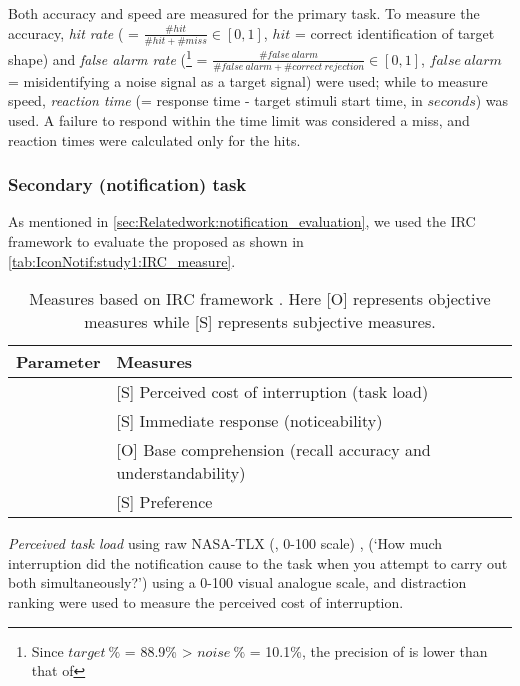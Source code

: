 Both accuracy and speed are measured for the primary task.
To measure the accuracy, \textit{hit rate} (\hitrate{} = $\frac{\#hit}{\#hit + \#miss} \in [0,1]$, $hit$ = correct identification of target shape) and \textit{false alarm rate} (\falsealarmrate{}\footnote{Since $target\:\%$ = 88.9\% > $noise\:\%$ = 10.1\%, the precision of \falsealarmrate{} is lower than that of  \hitrate{}} = $\frac{\#false\:alarm}{\#false\:alarm + \#correct\:rejection} \in [0,1]$, $false \: alarm$ = misidentifying a noise signal as a target signal) were used; while to measure speed, \textit{reaction time} (\reactionTime{}= response time - target stimuli start time, in $seconds$) was used. A failure to respond within the time limit was considered a miss, and reaction times were calculated only for the hits.

\subsubsection*{Secondary (notification) task}

As mentioned in \autoref{sec:Relatedwork:notification_evaluation}, we used the IRC framework to evaluate the proposed  as shown in \autoref{tab:IconNotif:study1:IRC_measure}.

\begin{table}[hptb]
\centering
\caption[Measures based on IRC framework]{Measures based on IRC framework \cite{chewar_unpacking_2004, mccrickard_model_2003, mccrickard_attuning_2003}. Here [O] represents objective measures while [S] represents subjective measures.}
\label{tab:IconNotif:study1:IRC_measure}
\small
\begin{tabular}{@{}ll@{}}
\toprule
Parameter & Measures \\ \midrule
\Interruption{} &  [S] Perceived cost of interruption (task load) \\
\Reaction{} &  [S] Immediate response (noticeability) \\
\Comprehension{} &  [O] Base comprehension (recall accuracy and understandability) \\
\Satisfaction{}  & [S] Preference \\ 
\bottomrule
\end{tabular}
\end{table}



\factor{\Interruption{}}
\textit{Perceived task load} using raw NASA-TLX (\perceivedTaskLoad{}, 0-100 scale) \cite{nasa_tlx_2006}, \perceivedInterruption{} (`How much interruption did the notification cause to the task when you attempt to carry out both simultaneously?') using a 0-100 visual analogue scale, and distraction ranking were used to measure the perceived cost of interruption. 


